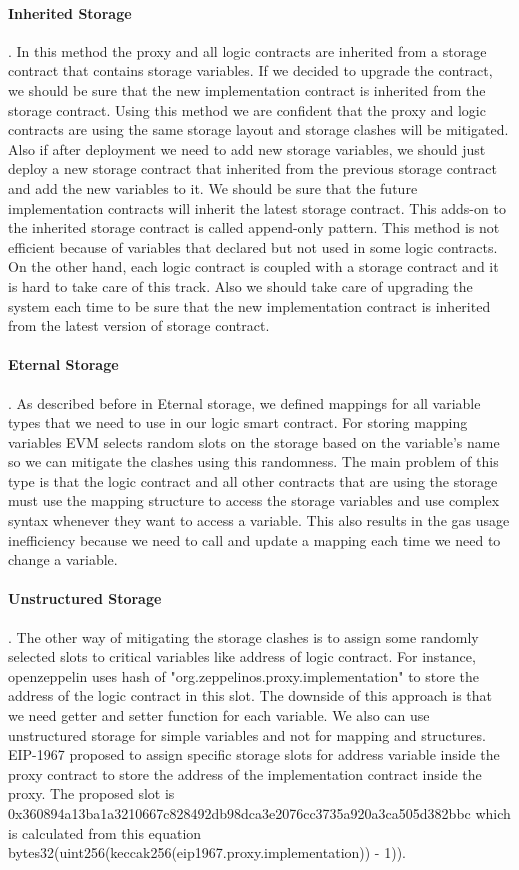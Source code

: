 \paragraph{Inherited Storage}. 
In this method the proxy and all logic contracts are inherited from a storage contract that contains storage variables. If we decided to upgrade the contract, we should be sure that the new implementation contract is inherited from the storage contract. Using this method we are confident that the proxy and logic contracts are using the same storage layout and storage clashes will be mitigated.
Also if after deployment we need to add new storage variables, we should just deploy a new storage contract that inherited from the previous storage contract and add the new variables to it. We should be sure that the future implementation contracts will inherit the latest storage contract. This adds-on to the inherited storage contract is called append-only pattern.
This method is not efficient because of variables that declared but not used in some logic contracts. On the other hand, each logic contract is coupled with a storage contract and it is hard to take care of this track. Also we should take care of upgrading the system each time to be sure that the new implementation contract is inherited from the latest version of storage contract.

\paragraph{Eternal Storage}. 
As described before in Eternal storage, we defined mappings for all variable types that we need to use in our logic smart contract. For storing mapping variables EVM selects random slots on the storage based on the variable's name so we can mitigate the clashes using this randomness.
The main problem of this type is that the logic contract and all other contracts that are using the storage must use the mapping structure to access the storage variables and use complex syntax whenever they want to access a variable. This also results in the gas usage inefficiency because we need to call and update a mapping each time we need to change a variable.  


\paragraph{Unstructured Storage}. 
The other way of mitigating the storage clashes is to assign some randomly selected slots to critical variables like address of logic contract. For instance, openzeppelin uses hash of "org.zeppelinos.proxy.implementation" to store the address of the logic contract in this slot.
The downside of this approach is that we need getter and setter function for each variable. We also can use unstructured storage for simple variables and not for mapping and structures. EIP-1967 proposed to assign specific storage slots for address variable inside the proxy contract to store the address of the implementation contract inside the proxy. The proposed slot is 0x360894a13ba1a3210667c828492db98dca3e2076cc3735a920a3ca505d382bbc which is calculated from this equation
bytes32(uint256(keccak256(eip1967.proxy.implementation)) - 1)). 

